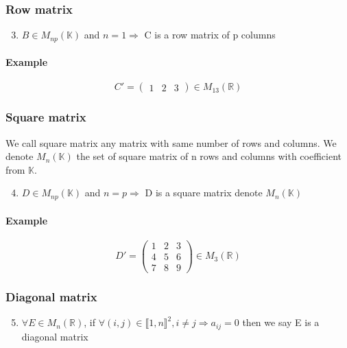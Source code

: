 \documentclass[notitlepage]{math}
\begin{document}
\subsubsection{Row matrix}
    \begin{enumerate}
        \setcounter{enumi}{2}
        \item $B \in M_{np}(\mathbb{K})$ and $ n = 1 \Rightarrow $ C is a row matrix of p columns
    \end{enumerate}
    \paragraph{Example}
    \[ C' = \begin{pmatrix}
        1 & 2 & 3
    \end{pmatrix} \in M_{13}(\mathbb{R})\]

\subsubsection{Square matrix}
    We call square matrix any matrix with same number of rows and columns.
    We denote $M_{n}(\mathbb{K})$ the set of square matrix of n rows and columns with coefficient from $\mathbb{K}$.
    \begin{enumerate}
        \setcounter{enumi}{3}
        \item $D \in M_{np}(\mathbb{K})$ and $ n = p \Rightarrow $ D is a square matrix denote $M_{n}(\mathbb{K})$
    \end{enumerate}
    \paragraph{Example}
    \[ D' = \begin{pmatrix}
        1 & 2 & 3 \\
        4 & 5 & 6 \\
        7 & 8 & 9
    \end{pmatrix} \in M_{3}(\mathbb{R})\]

\subsubsection{Diagonal matrix}
    \begin{enumerate}
        \setcounter{enumi}{4}
        \item $\forall E \in M_{n}(\mathbb{R})$, if $\forall (i,j) \in \llbracket 1,n \rrbracket ^2, i \neq j \Rightarrow a_{ij} = 0$ then we say E is a diagonal matrix
    \end{enumerate}
\end{document}
